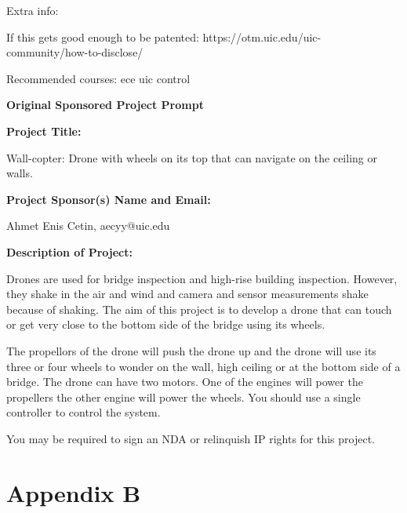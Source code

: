 \documentclass[12pt]{article}
\begin{document}
            \noindent Extra info:

            If this gets good enough to be patented: https://otm.uic.edu/uic-community/how-to-disclose/

            Recommended courses: ece uic control
        
        \vspace{1cm}\noindent\textbf{\large Original Sponsored Project Prompt}

            \noindent\textbf{Project Title:}

            Wall-copter: Drone with wheels on its top that can navigate on the ceiling or walls.

            \noindent\textbf{Project Sponsor(s) Name and Email:}

            Ahmet Enis Cetin, aecyy@uic.edu

            \noindent\textbf{Description of Project:}

            Drones are used for bridge inspection and high-rise building inspection. However, they shake in the air and wind and camera and sensor measurements shake because of shaking. The aim of this project is to develop a drone that can touch or get very close to the bottom side of the bridge using its wheels.

            The propellors of the drone will push the drone up and the drone will use its three or four wheels to wonder on the wall, high ceiling or at the bottom side of a bridge. The drone can have two motors. One of the engines will power the propellers the other engine will power the wheels. You should use a single controller to control the system.

            You may be required to sign an NDA or relinquish IP rights for this project.
    
    \section{Appendix B}
        \newcommand{\ieeestd}[3]{
            \textbf{ #1 } \\
            #2 \\
            #3 \\
            \vspace{1cm}
        }
\end{document}
